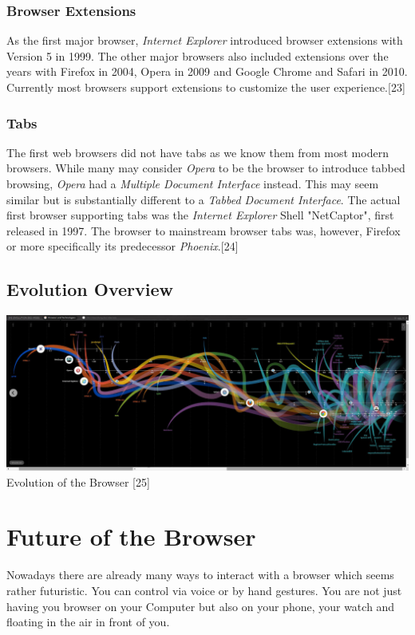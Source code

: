 \documentclass[runningheads]{llncs}
\begin{document}
			\subsubsection{Browser Extensions}
			\leavevmode\newline
			As the first major browser, \textit{Internet Explorer} introduced browser extensions with Version 5 in 1999. The other major browsers also included extensions over the years with Firefox in 2004, Opera in 2009 and Google Chrome and Safari in 2010. Currently most browsers support extensions to customize the user experience.[23]
			\subsubsection{Tabs}
			\leavevmode\newline
			The first web browsers did not have tabs as we know them from most modern browsers. While many may consider \textit{Opera} to be the browser to introduce tabbed browsing, \textit{Opera} had a  \textit{Multiple Document Interface} instead. This may seem similar but is substantially different to a \textit{Tabbed Document Interface}. The actual first browser supporting tabs was the \textit{Internet Explorer} Shell "NetCaptor", first released in 1997. The browser to mainstream browser tabs was, however, Firefox or more specifically its predecessor \textit{Phoenix}.[24]
		\subsection{Evolution Overview}
		\begin{center}
		\includegraphics[scale=0.205]{PanoramaEvoOfBr.JPEG}
		Evolution of the Browser [25]
		\end{center}
	\section{Future of the Browser}
	Nowadays there are already many ways to interact with a browser which seems rather futuristic. You can control via voice or by hand gestures. You are not just having you browser on your Computer but also on your phone, your watch and floating in the air in front of you.
\end{document}
